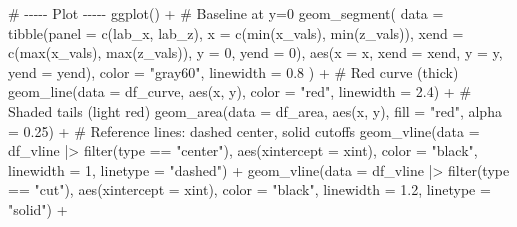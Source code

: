 \documentclass[
  letterpaper,
  DIV=11,
  numbers=noendperiod]{scrreprt}
\newenvironment{Shaded}{\begin{snugshade}}{\end{snugshade}}
\newcommand{\AttributeTok}[1]{\textcolor[rgb]{0.40,0.45,0.13}{#1}}
\newcommand{\CommentTok}[1]{\textcolor[rgb]{0.37,0.37,0.37}{#1}}
\newcommand{\DecValTok}[1]{\textcolor[rgb]{0.68,0.00,0.00}{#1}}
\newcommand{\FloatTok}[1]{\textcolor[rgb]{0.68,0.00,0.00}{#1}}
\newcommand{\FunctionTok}[1]{\textcolor[rgb]{0.28,0.35,0.67}{#1}}
\newcommand{\NormalTok}[1]{\textcolor[rgb]{0.00,0.23,0.31}{#1}}
\newcommand{\SpecialCharTok}[1]{\textcolor[rgb]{0.37,0.37,0.37}{#1}}
\newcommand{\StringTok}[1]{\textcolor[rgb]{0.13,0.47,0.30}{#1}}
\begin{document}
\begin{Shaded}
\begin{Highlighting}[]
\CommentTok{\# {-}{-}{-}{-}{-} Plot {-}{-}{-}{-}{-}}
\FunctionTok{ggplot}\NormalTok{() }\SpecialCharTok{+}
  \CommentTok{\# Baseline at y=0}
  \FunctionTok{geom\_segment}\NormalTok{(}
    \AttributeTok{data =} \FunctionTok{tibble}\NormalTok{(}\AttributeTok{panel =} \FunctionTok{c}\NormalTok{(lab\_x, lab\_z),}
                  \AttributeTok{x =} \FunctionTok{c}\NormalTok{(}\FunctionTok{min}\NormalTok{(x\_vals), }\FunctionTok{min}\NormalTok{(z\_vals)),}
                  \AttributeTok{xend =} \FunctionTok{c}\NormalTok{(}\FunctionTok{max}\NormalTok{(x\_vals), }\FunctionTok{max}\NormalTok{(z\_vals)),}
                  \AttributeTok{y =} \DecValTok{0}\NormalTok{, }\AttributeTok{yend =} \DecValTok{0}\NormalTok{),}
    \FunctionTok{aes}\NormalTok{(}\AttributeTok{x =}\NormalTok{ x, }\AttributeTok{xend =}\NormalTok{ xend, }\AttributeTok{y =}\NormalTok{ y, }\AttributeTok{yend =}\NormalTok{ yend),}
    \AttributeTok{color =} \StringTok{"gray60"}\NormalTok{, }\AttributeTok{linewidth =} \FloatTok{0.8}
\NormalTok{  ) }\SpecialCharTok{+}
  \CommentTok{\# Red curve (thick)}
  \FunctionTok{geom\_line}\NormalTok{(}\AttributeTok{data =}\NormalTok{ df\_curve, }\FunctionTok{aes}\NormalTok{(x, y), }\AttributeTok{color =} \StringTok{"red"}\NormalTok{, }\AttributeTok{linewidth =} \FloatTok{2.4}\NormalTok{) }\SpecialCharTok{+}
  \CommentTok{\# Shaded tails (light red)}
  \FunctionTok{geom\_area}\NormalTok{(}\AttributeTok{data =}\NormalTok{ df\_area, }\FunctionTok{aes}\NormalTok{(x, y), }\AttributeTok{fill =} \StringTok{"red"}\NormalTok{, }\AttributeTok{alpha =} \FloatTok{0.25}\NormalTok{) }\SpecialCharTok{+}
  \CommentTok{\# Reference lines: dashed center, solid cutoffs}
  \FunctionTok{geom\_vline}\NormalTok{(}\AttributeTok{data =}\NormalTok{ df\_vline }\SpecialCharTok{|\textgreater{}} \FunctionTok{filter}\NormalTok{(type }\SpecialCharTok{==} \StringTok{"center"}\NormalTok{),}
             \FunctionTok{aes}\NormalTok{(}\AttributeTok{xintercept =}\NormalTok{ xint),}
             \AttributeTok{color =} \StringTok{"black"}\NormalTok{, }\AttributeTok{linewidth =} \DecValTok{1}\NormalTok{, }\AttributeTok{linetype =} \StringTok{"dashed"}\NormalTok{) }\SpecialCharTok{+}
  \FunctionTok{geom\_vline}\NormalTok{(}\AttributeTok{data =}\NormalTok{ df\_vline }\SpecialCharTok{|\textgreater{}} \FunctionTok{filter}\NormalTok{(type }\SpecialCharTok{==} \StringTok{"cut"}\NormalTok{),}
             \FunctionTok{aes}\NormalTok{(}\AttributeTok{xintercept =}\NormalTok{ xint),}
             \AttributeTok{color =} \StringTok{"black"}\NormalTok{, }\AttributeTok{linewidth =} \FloatTok{1.2}\NormalTok{, }\AttributeTok{linetype =} \StringTok{"solid"}\NormalTok{) }\SpecialCharTok{+}

\end{Highlighting}
\end{Shaded}
\end{document}
